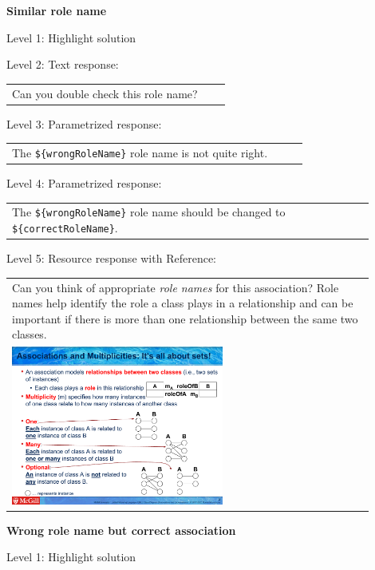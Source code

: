 \noindent \textbf{Similar role name} \medskip

\noindent Level 1: Highlight solution \medskip

\noindent Level 2: Text response: \medskip

\begin{tabular}{|p{0.9\linewidth}}
Can you double check this role name?
\end{tabular} \medskip

\noindent Level 3: Parametrized response: \medskip

\begin{tabular}{|p{0.9\linewidth}}
The \verb|${wrongRoleName}| role name is not quite right.
\end{tabular} \medskip

\noindent Level 4: Parametrized response: \medskip

\begin{tabular}{|p{0.9\linewidth}}
The \verb|${wrongRoleName}| role name should be changed to \verb|${correctRoleName}|.
\end{tabular} \medskip

\noindent Level 5: Resource response with Reference: \medskip

\begin{tabular}{|p{0.9\linewidth}}
Can you think of appropriate \textit{role names}
for this association? Role names help identify the role a class plays in a
relationship and can be important if there is more than one relationship
between the same two classes.

\\
\includegraphics[width=0.6\textwidth]{images/role_name.png}

\end{tabular} \medskip


\noindent \textbf{Wrong role name but correct association} \medskip

\noindent Level 1: Highlight solution \medskip

